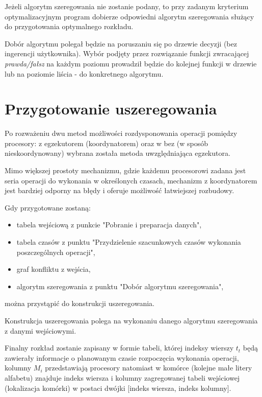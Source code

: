 \documentclass[brudnopis]{xmgr}
\begin{document}
Jeżeli algorytm szeregowania nie zostanie podany, to przy zadanym kryterium optymalizacyjnym program dobierze odpowiedni algorytm szeregowania służący do przygotowania optymalnego rozkładu.
\medskip

Dobór algorytmu polegał będzie na poruszaniu się po drzewie decyzji (bez ingerencji użytkownika).
Wybór podjęty przez rozwiązanie funkcji zwracającej \emph{prawda/fałsz} na każdym poziomu prowadził będzie do kolejnej funkcji w drzewie lub na poziomie liścia - do konkretnego algorytmu.


\section{Przygotowanie uszeregowania}

Po rozważeniu dwu metod możliwości rozdysponowania operacji pomiędzy procesory: z egzekutorem (koordynatorem) oraz w bez (w sposób nieskoordynowany) wybrana została metoda uwzględniająca egzekutora.
\medskip

Mimo większej prostoty mechanizmu, gdzie każdemu procesorowi zadana jest seria operacji do wykonania w określonych czasach, mechanizm z koordynatorem jest bardziej odporny na błędy i oferuje możliwość łatwiejszej rozbudowy.

Gdy przygotowane zostaną:

\begin{itemize}
    \item tabela wejściową z punkcie "Pobranie i preparacja danych",
    \item tabela czasów z punktu "Przydzielenie szacunkowych czasów wykonania poszczególnych operacji",
    \item graf konfliktu z wejścia,
    \item algorytm szeregowania z punktu "Dobór algorytmu szeregowania",
\end{itemize}

można przystąpić do konstrukcji uszeregowania.
\medskip

Konstrukcja uszeregowania polega na wykonaniu danego algorytmu szeregowania z danymi wejściowymi.
\medskip

Finalny rozkład zostanie zapisany w formie tabeli, której indeksy wierszy $t_t$ będą zawierały informacje o planowanym czasie rozpoczęcia wykonania operacji, kolumny $M_i$ przedstawiają procesory natomiast w komórce (kolejne małe litery alfabetu) znajduje indeks wiersza i kolumny zagregowanej tabeli wejściowej (lokalizacja komórki) w postaci dwójki [indeks wiersza, indeks kolumny].
\medskip
\end{document}
